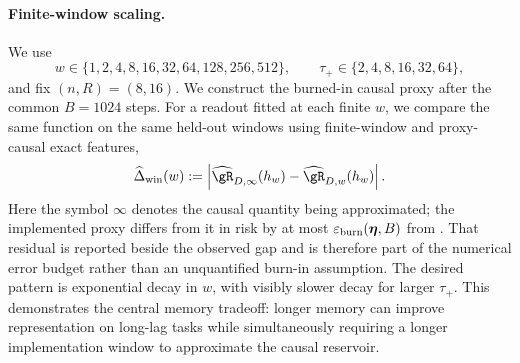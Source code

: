 \paragraph{Finite-window scaling.}
We use
\begin{equation}
    w\in\{1,2,4,8,16,32,64,128,256,512\},
    \qquad
    \tau_+\in\{2,4,8,16,32,64\},
    \label{eq:w-memory-grid}
\end{equation}
and fix $(n,R)=(8,16)$.  We construct the burned-in causal proxy
after the common $B=1024$ steps.  For a readout fitted at each finite $w$, we
compare the same function on the same held-out windows using finite-window and
proxy-causal exact features,
\begin{equation}
    \widehat\Delta_{\mathrm{win}}(w)
    :=\left|
        \widehat\risk_{D,\infty}(h_w)
        -\widehat\risk_{D,w}(h_w)
      \right|.
    \label{eq:empirical-window-gap}
\end{equation}
Here the symbol $\infty$ denotes the causal quantity being approximated; the
implemented proxy differs from it in risk by at most
$\varepsilon_{\mathrm{burn}}(\bm{\eta},B)$ from .  That residual is
reported beside the observed gap and is therefore part of the numerical error
budget rather than an unquantified burn-in assumption.
The desired pattern is exponential decay in $w$, with visibly slower decay for
larger $\tau_+$.  This demonstrates the central memory tradeoff: longer memory
can improve representation on long-lag tasks while simultaneously requiring a
longer implementation window to approximate the causal reservoir.

